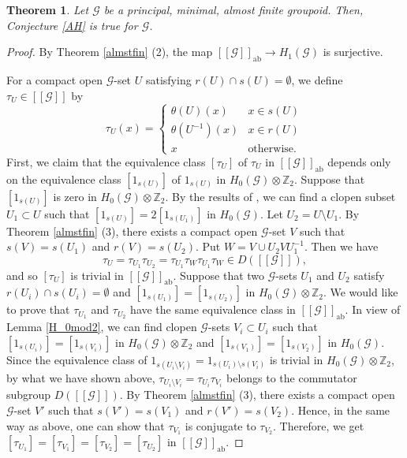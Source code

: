 \documentclass[11pt]{article}
\newtheorem{theorem}{Theorem}[section]
\theoremstyle{definition}
\numberwithin{equation}{section}
\newcommand{\ab}{\mathrm{ab}}
\newcommand{\G}{\mathcal{G}}
\newcommand{\Z}{\mathbb{Z}}
\begin{document}
\begin{theorem}\label{almstfin>AH}
Let $\G$ be a principal, minimal, almost finite groupoid. 
Then, Conjecture \ref{AH} is true for $\G$. 
\end{theorem}
\begin{proof}
By Theorem \ref{almstfin} (2), 
the map $[[\G]]_\ab\to H_1(\G)$ is surjective. 

For a compact open $\G$-set $U$ satisfying $r(U)\cap s(U)=\emptyset$, 
we define $\tau_U\in[[\G]]$ by 
\[
\tau_U(x)=\begin{cases}\theta(U)(x)&x\in s(U)\\
\theta(U^{-1})(x)&x\in r(U)\\x&\text{otherwise. }\end{cases}
\]
First, we claim that 
the equivalence class $[\tau_U]$ of $\tau_U$ in $[[\G]]_\ab$ 
depends only on the equivalence class $[1_{s(U)}]$ 
of $1_{s(U)}$ in $H_0(\G)\otimes\Z_2$. 
Suppose that $[1_{s(U)}]$ is zero in $H_0(\G)\otimes\Z_2$. 
By the results of \cite[Section 6.2]{M12PLMS}, 
we can find a clopen subset $U_1\subset U$ 
such that $[1_{s(U)}]=2[1_{s(U_1)}]$ in $H_0(\G)$. 
Let $U_2=U\setminus U_1$. 
By Theorem \ref{almstfin} (3), there exists a compact open $\G$-set $V$ 
such that $s(V)=s(U_1)$ and $r(V)=s(U_2)$. 
Put $W=V\cup U_2VU_1^{-1}$. 
Then we have 
\[
\tau_U=\tau_{U_1}\tau_{U_2}=\tau_{U_1}\tau_W\tau_{U_1}\tau_W\in D([[\G]]), 
\]
and so $[\tau_U]$ is trivial in $[[\G]]_\ab$. 
Suppose that two $\G$-sets $U_1$ and $U_2$ satisfy 
$r(U_i)\cap s(U_i)=\emptyset$ and 
$[1_{s(U_1)}]=[1_{s(U_2)}]$ in $H_0(\G)\otimes\Z_2$. 
We would like to prove that 
$\tau_{U_1}$ and $\tau_{U_2}$ have the same equivalence class in $[[\G]]_\ab$. 
In view of Lemma \ref{H_0mod2}, we can find clopen $\G$-sets $V_i\subset U_i$ 
such that $[1_{s(U_i)}]=[1_{s(V_i)}]$ in $H_0(\G)\otimes\Z_2$ and 
$[1_{s(V_1)}]=[1_{s(V_2)}]$ in $H_0(\G)$. 
Since the equivalence class of 
$1_{s(U_i\setminus V_i)}=1_{s(U_i)\setminus s(V_i)}$ is trivial 
in $H_0(\G)\otimes\Z_2$, 
by what we have shown above, 
$\tau_{U_i\setminus V_i}=\tau_{U_i}\tau_{V_i}$ belongs to 
the commutator subgroup $D([[\G]])$. 
By Theorem \ref{almstfin} (3), 
there exists a compact open $\G$-set $V'$ 
such that $s(V')=s(V_1)$ and $r(V')=s(V_2)$. 
Hence, in the same way as above, 
one can show that $\tau_{V_1}$ is conjugate to $\tau_{V_2}$. 
Therefore, 
we get $[\tau_{U_1}]=[\tau_{V_1}]=[\tau_{V_2}]=[\tau_{U_2}]$ in $[[\G]]_\ab$. 


\end{proof}
\end{document}
